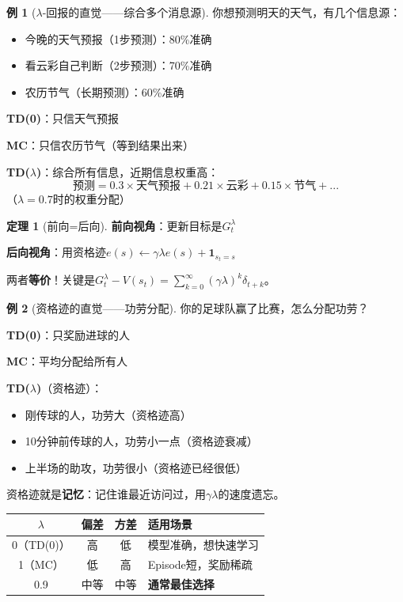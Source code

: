 \documentclass[11pt,a4paper]{article}
\theoremstyle{definition}
\newtheorem{example}{例}[section]
\newtheorem{theorem}{定理}[section]
\begin{document}
\begin{example}[$\lambda$-回报的直觉——综合多个消息源]
你想预测明天的天气，有几个信息源：
\begin{itemize}
    \item 今晚的天气预报（1步预测）：80\%准确
    \item 看云彩自己判断（2步预测）：70\%准确
    \item 农历节气（长期预测）：60\%准确
\end{itemize}

\textbf{TD(0)}：只信天气预报

\textbf{MC}：只信农历节气（等到结果出来）

\textbf{TD($\lambda$)}：综合所有信息，近期信息权重高：
\[
\text{预测} = 0.3 \times \text{天气预报} + 0.21 \times \text{云彩} + 0.15 \times \text{节气} + ...
\]
（$\lambda = 0.7$时的权重分配）
\end{example}

\begin{theorem}[前向=后向]
\textbf{前向视角}：更新目标是$G_t^\lambda$

\textbf{后向视角}：用资格迹$e(s) \leftarrow \gamma\lambda e(s) + \mathbf{1}_{s_t=s}$

两者\textbf{等价}！关键是$G_t^\lambda - V(s_t) = \sum_{k=0}^\infty (\gamma\lambda)^k \delta_{t+k}$。
\end{theorem}

\begin{example}[资格迹的直觉——功劳分配]
你的足球队赢了比赛，怎么分配功劳？

\textbf{TD(0)}：只奖励进球的人

\textbf{MC}：平均分配给所有人

\textbf{TD($\lambda$)}（资格迹）：
\begin{itemize}
    \item 刚传球的人，功劳大（资格迹高）
    \item 10分钟前传球的人，功劳小一点（资格迹衰减）
    \item 上半场的助攻，功劳很小（资格迹已经很低）
\end{itemize}

资格迹就是\textbf{记忆}：记住谁最近访问过，用$\gamma\lambda$的速度遗忘。
\end{example}

\begin{keypoint}
\begin{center}
\begin{tabular}{c|c|c|l}
\toprule
$\lambda$ & 偏差 & 方差 & 适用场景 \\
\midrule
0（TD(0)） & 高 & 低 & 模型准确，想快速学习 \\
1（MC） & 低 & 高 & Episode短，奖励稀疏 \\
0.9 & 中等 & 中等 & \textbf{通常最佳选择} \\
\bottomrule
\end{tabular}
\end{center}
\end{keypoint}
\end{document}
